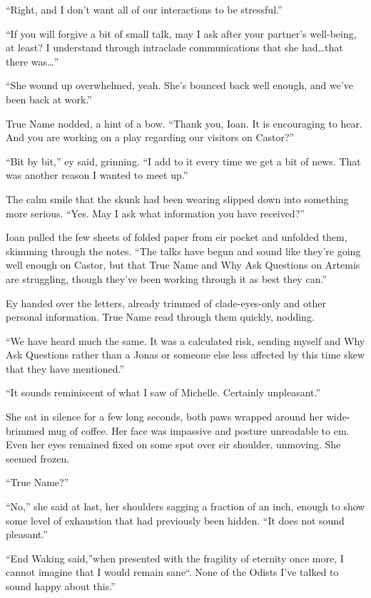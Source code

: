 ``Right, and I don't want all of our interactions to be stressful.''

``If you will forgive a bit of small talk, may I ask after your partner's well-being, at least? I understand through intraclade communications that she had\ldots that there was\ldots{}''

``She wound up overwhelmed, yeah. She's bounced back well enough, and we've been back at work.''

True Name nodded, a hint of a bow. ``Thank you, Ioan. It is encouraging to hear. And you are working on a play regarding our visitors on Castor?''

``Bit by bit,'' ey said, grinning. ``I add to it every time we get a bit of news. That was another reason I wanted to meet up.''

The calm smile that the skunk had been wearing slipped down into something more serious. ``Yes. May I ask what information you have received?''

Ioan pulled the few sheets of folded paper from eir pocket and unfolded them, skimming through the notes. ``The talks have begun and sound like they're going well enough on Castor, but that True Name and Why Ask Questions on Artemis are struggling, though they've been working through it as best they can.''

Ey handed over the letters, already trimmed of clade-eyes-only and other personal information. True Name read through them quickly, nodding.

``We have heard much the same. It was a calculated risk, sending myself and Why Ask Questions rather than a Jonas or someone else less affected by this time skew that they have mentioned.''

``It sounds reminiscent of what I saw of Michelle. Certainly unpleasant.''

She sat in silence for a few long seconds, both paws wrapped around her wide-brimmed mug of coffee. Her face was impassive and posture unreadable to em. Even her eyes remained fixed on some spot over eir shoulder, unmoving. She seemed frozen.

``True Name?''

``No,'' she said at last, her shoulders sagging a fraction of an inch, enough to show some level of exhaustion that had previously been hidden. ``It does not sound pleasant.''

``End Waking said,''when presented with the fragility of eternity once more, I cannot imagine that I would remain sane``. None of the Odists I've talked to sound happy about this.''

